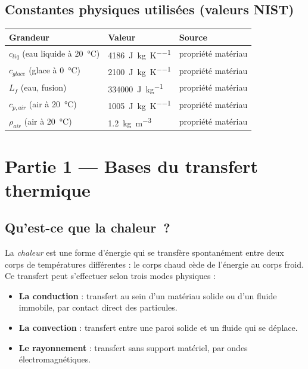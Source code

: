 \documentclass[11pt,a4paper]{article}
\begin{document}
\subsection{Constantes physiques utilisées (valeurs NIST)}

\begin{center}
\begin{tabular}{lll}
\toprule
\textbf{Grandeur} & \textbf{Valeur} & \textbf{Source} \\
\midrule
$c_{liq}$ (eau liquide à \SI{20}{\celsius}) & \SI{4186}{\joule\per\kilogram\per\kelvin} & propriété matériau \\
$c_{glace}$ (glace à \SI{0}{\celsius}) & \SI{2100}{\joule\per\kilogram\per\kelvin} & propriété matériau \\
$L_f$ (eau, fusion) & \SI{334000}{\joule\per\kilogram} & propriété matériau \\
$c_{p,air}$ (air à \SI{20}{\celsius}) & \SI{1005}{\joule\per\kilogram\per\kelvin} & propriété matériau \\
$\rho_{air}$ (air à \SI{20}{\celsius}) & \SI{1,2}{\kilogram\per\meter\cubed} & propriété matériau \\
\bottomrule
\end{tabular}
\end{center}

\newpage
\section{Partie 1 — Bases du transfert thermique}

\subsection{Qu'est-ce que la chaleur~?}

La \emph{chaleur} est une forme d'énergie qui se transfère spontanément entre deux corps de
températures différentes : le corps chaud cède de l'énergie au corps froid. Ce transfert
peut s'effectuer selon trois modes physiques :

\begin{itemize}[itemsep=2pt]
\item \textbf{La conduction} : transfert au sein d'un matériau solide ou d'un fluide
immobile, par contact direct des particules.
\item \textbf{La convection} : transfert entre une paroi solide et un fluide qui se déplace.
\item \textbf{Le rayonnement} : transfert sans support matériel, par ondes électromagnétiques.
\end{itemize}
\end{document}
